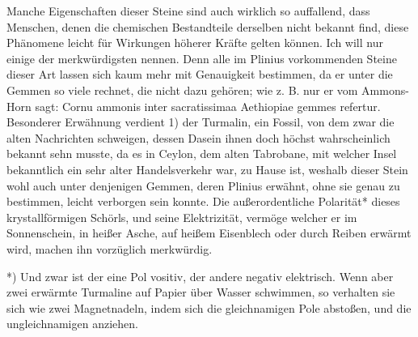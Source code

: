 \documentclass[a4paper, 11pt, oneside, polutonikogreek, german]{article}
\begin{document}
Manche Eigenschaften dieser Steine sind auch wirklich so auffallend, dass Menschen, denen die chemischen Bestandteile derselben nicht bekannt find, diese Phänomene leicht für Wirkungen höherer Kräfte gelten können. Ich will nur einige der merkwürdigsten nennen. Denn alle im Plinius vorkommenden Steine dieser Art lassen sich kaum mehr mit Genauigkeit bestimmen, da er unter die Gemmen so viele rechnet, die nicht dazu gehören; wie z. B. nur er vom Ammons-Horn sagt: Cornu ammonis inter sacratissimaa Aethiopiae gemmes refertur. Besonderer Erwähnung verdient 1) der Turmalin, ein Fossil, von dem zwar die alten Nachrichten schweigen, dessen Dasein ihnen doch höchst wahrscheinlich bekannt sehn musste, da es in Ceylon, dem alten Tabrobane, mit welcher Insel bekanntlich ein sehr alter Handelsverkehr war, zu Hause ist, weshalb dieser Stein wohl auch unter denjenigen Gemmen, deren Plinius erwähnt, ohne sie genau zu bestimmen, leicht verborgen sein konnte. Die außerordentliche Polarität* dieses krystallförmigen Schörls, und seine Elektrizität, vermöge welcher er im Sonnenschein, in heißer Asche, auf heißem Eisenblech oder durch Reiben erwärmt wird, machen ihn vorzüglich merkwürdig.

*) Und zwar ist der eine Pol vositiv, der andere negativ elektrisch. Wenn aber zwei erwärmte Turmaline auf Papier über Wasser schwimmen, so verhalten sie sich wie zwei Magnetnadeln, indem sich die gleichnamigen Pole abstoßen, und die ungleichnamigen anziehen.
\end{document}
